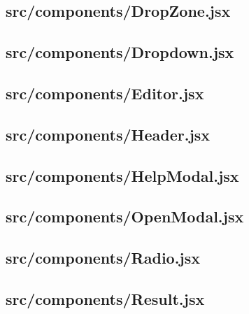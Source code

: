 \subsection{src/components/DropZone.jsx}
\label{app:client_src_components_DropZone_jsx}

\subsection{src/components/Dropdown.jsx}
\label{app:client_src_components_Dropdown_jsx}

\subsection{src/components/Editor.jsx}
\label{app:client_src_components_Editor_jsx}

\subsection{src/components/Header.jsx}
\label{app:client_src_components_Header_jsx}

\subsection{src/components/HelpModal.jsx}
\label{app:client_src_components_HelpModal_jsx}

\subsection{src/components/OpenModal.jsx}
\label{app:client_src_components_OpenModal_jsx}

\subsection{src/components/Radio.jsx}
\label{app:client_src_components_Radio_jsx}

\subsection{src/components/Result.jsx}
\label{app:client_src_components_Result_jsx}

